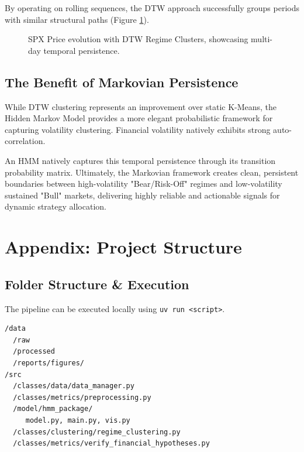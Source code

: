 \documentclass[a4paper,fleqn]{cas-dc} %
\begin{document}
By operating on rolling sequences, the DTW approach successfully groups periods with similar structural paths (Figure \ref{fig:dtw_timeline}).

\begin{figure}[htbp]
    \centering
    
    \caption{SPX Price evolution with DTW Regime Clusters, showcasing multi-day temporal persistence.}
    \label{fig:dtw_timeline}
\end{figure}

\subsection{The Benefit of Markovian Persistence}
While DTW clustering represents an improvement over static K-Means, the Hidden Markov Model provides a more elegant probabilistic framework for capturing volatility clustering. Financial volatility natively exhibits strong auto-correlation. 

An HMM natively captures this temporal persistence through its transition probability matrix. Ultimately, the Markovian framework creates clean, persistent boundaries between high-volatility "Bear/Risk-Off" regimes and low-volatility sustained "Bull" markets, delivering highly reliable and actionable signals for dynamic strategy allocation.

\appendix
\section{Appendix: Project Structure}

\subsection{Folder Structure \& Execution}
The pipeline can be executed locally using \texttt{uv run <script>}.
\begin{verbatim}
/data
  /raw
  /processed
  /reports/figures/
/src
  /classes/data/data_manager.py
  /classes/metrics/preprocessing.py
  /model/hmm_package/
     model.py, main.py, vis.py
  /classes/clustering/regime_clustering.py
  /classes/metrics/verify_financial_hypotheses.py
\end{verbatim}


 
\end{document}
